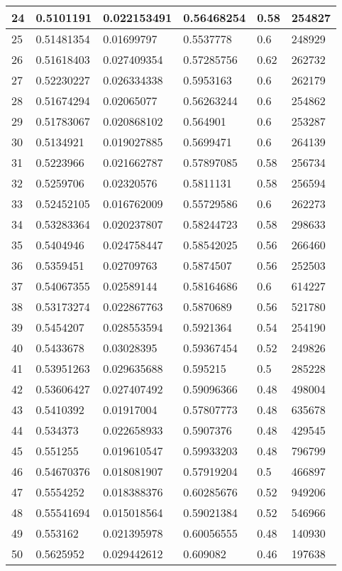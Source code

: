 \begin{longtable}{|l|l|l|l|l|l|}
24 & 0.5101191 & 0.022153491 & 0.56468254 & 0.58 & 254827 \\ \hline 
25 & 0.51481354 & 0.01699797 & 0.5537778 & 0.6 & 248929 \\ \hline 
26 & 0.51618403 & 0.027409354 & 0.57285756 & 0.62 & 262732 \\ \hline 
27 & 0.52230227 & 0.026334338 & 0.5953163 & 0.6 & 262179 \\ \hline 
28 & 0.51674294 & 0.02065077 & 0.56263244 & 0.6 & 254862 \\ \hline 
29 & 0.51783067 & 0.020868102 & 0.564901 & 0.6 & 253287 \\ \hline 
30 & 0.5134921 & 0.019027885 & 0.5699471 & 0.6 & 264139 \\ \hline 
31 & 0.5223966 & 0.021662787 & 0.57897085 & 0.58 & 256734 \\ \hline 
32 & 0.5259706 & 0.02320576 & 0.5811131 & 0.58 & 256594 \\ \hline 
33 & 0.52452105 & 0.016762009 & 0.55729586 & 0.6 & 262273 \\ \hline 
34 & 0.53283364 & 0.020237807 & 0.58244723 & 0.58 & 298633 \\ \hline 
35 & 0.5404946 & 0.024758447 & 0.58542025 & 0.56 & 266460 \\ \hline 
36 & 0.5359451 & 0.02709763 & 0.5874507 & 0.56 & 252503 \\ \hline 
37 & 0.54067355 & 0.02589144 & 0.58164686 & 0.6 & 614227 \\ \hline 
38 & 0.53173274 & 0.022867763 & 0.5870689 & 0.56 & 521780 \\ \hline 
39 & 0.5454207 & 0.028553594 & 0.5921364 & 0.54 & 254190 \\ \hline 
40 & 0.5433678 & 0.03028395 & 0.59367454 & 0.52 & 249826 \\ \hline 
41 & 0.53951263 & 0.029635688 & 0.595215 & 0.5 & 285228 \\ \hline 
42 & 0.53606427 & 0.027407492 & 0.59096366 & 0.48 & 498004 \\ \hline 
43 & 0.5410392 & 0.01917004 & 0.57807773 & 0.48 & 635678 \\ \hline 
44 & 0.534373 & 0.022658933 & 0.5907376 & 0.48 & 429545 \\ \hline 
45 & 0.551255 & 0.019610547 & 0.59933203 & 0.48 & 796799 \\ \hline 
46 & 0.54670376 & 0.018081907 & 0.57919204 & 0.5 & 466897 \\ \hline 
47 & 0.5554252 & 0.018388376 & 0.60285676 & 0.52 & 949206 \\ \hline 
48 & 0.55541694 & 0.015018564 & 0.59021384 & 0.52 & 546966 \\ \hline 
49 & 0.553162 & 0.021395978 & 0.60056555 & 0.48 & 140930 \\ \hline 
50 & 0.5625952 & 0.029442612 & 0.609082 & 0.46 & 197638 \\ \hline 
\end{longtable}